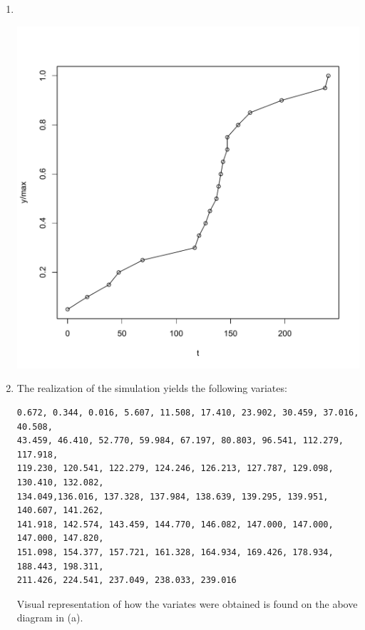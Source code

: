 \documentclass[11pt]{article} %
\begin{document}
\begin{enumerate}
\begin{enumerate}

\item 

$ $

\includegraphics[scale = 0.5]{plot1.pdf}

\item The realization of the simulation yields the following variates:

\begin{verbatim}0.672, 0.344, 0.016, 5.607, 11.508, 17.410, 23.902, 30.459, 37.016, 40.508, 
43.459, 46.410, 52.770, 59.984, 67.197, 80.803, 96.541, 112.279, 117.918, 
119.230, 120.541, 122.279, 124.246, 126.213, 127.787, 129.098, 130.410, 132.082, 
134.049,136.016, 137.328, 137.984, 138.639, 139.295, 139.951, 140.607, 141.262,
141.918, 142.574, 143.459, 144.770, 146.082, 147.000, 147.000, 147.000, 147.820,
151.098, 154.377, 157.721, 161.328, 164.934, 169.426, 178.934, 188.443, 198.311,
211.426, 224.541, 237.049, 238.033, 239.016\end{verbatim}

Visual representation of how the variates were obtained is found on the above diagram in (a).

\end{enumerate}


\end{enumerate}
\end{document}
